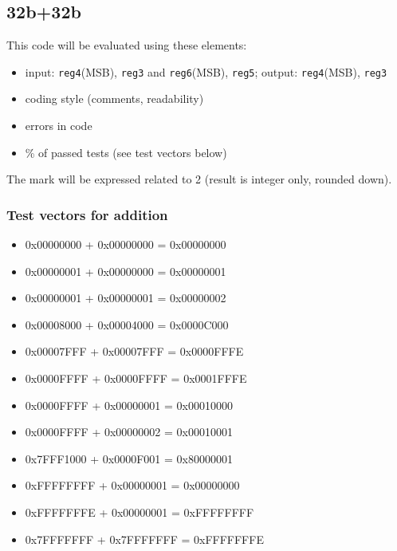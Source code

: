 \documentclass[10pt,a4paper]{article}
\theoremstyle{definition}%
\begin{document}
\subsection{32b+32b}
This code will be evaluated using these elements:
\begin{itemize}
\item input: \verb!reg4!(MSB), \verb!reg3! and \verb!reg6!(MSB), \verb!reg5!; output: \verb!reg4!(MSB), \verb!reg3!
\item coding style (comments, readability)
\item errors in code
\item \% of passed tests (see test vectors below)
\end{itemize}
The mark will be expressed related to 2 (result is integer only, rounded down).
\newpage
\subsubsection{Test vectors for addition}
{\ttfamily
\begin{itemize}
\item 0x00000000 + 0x00000000 =  0x00000000
\item 0x00000001 + 0x00000000 =  0x00000001
\item 0x00000001 + 0x00000001 =  0x00000002
\item 0x00008000 + 0x00004000 =  0x0000C000 

\item 0x00007FFF + 0x00007FFF =  0x0000FFFE
\item 0x0000FFFF + 0x0000FFFF =  0x0001FFFE
\item 0x0000FFFF + 0x00000001 =  0x00010000
\item 0x0000FFFF + 0x00000002 =  0x00010001

\item 0x7FFF1000 + 0x0000F001 =  0x80000001
\item 0xFFFFFFFF + 0x00000001 =  0x00000000
\item 0xFFFFFFFE + 0x00000001 =  0xFFFFFFFF
\item 0x7FFFFFFF + 0x7FFFFFFF =  0xFFFFFFFE
\end{itemize}}
\end{document}
